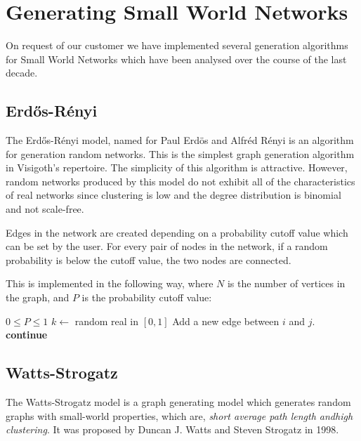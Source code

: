 \documentclass[a4paper,11pt,titlepage]{article}
\let\stdsection\section         %
\renewcommand{\section}{\newpage\stdsection}
\begin{document}

\section{Generating Small World Networks}
\label{smallworldnetworks}

On request of our customer we have implemented several generation
algorithms for Small World Networks which have been analysed over
the course of the last decade.

\subsection{Erd\H{o}s-R\'{e}nyi}
The Erd\H{o}s-R\'{e}nyi model, named for Paul Erd\"{o}s and Alfr\'{e}d R\'{e}nyi
is an algorithm for generation random networks. This is the simplest graph
generation algorithm in Visigoth's repertoire. The simplicity of this algorithm
is attractive. However, random networks produced by this model do not exhibit
all of the characteristics of real networks since clustering is low and the
degree distribution is binomial and not scale-free.

Edges in the network are created depending on a probability cutoff value which
can be set by the user. For every pair of nodes in the network, if a random
probability is below the cutoff value, the two nodes are connected.

This is implemented in the following way, where $N$ is the number of vertices
in the graph, and $P$ is the probability cutoff value:
\begin{algorithmic}
  \REQUIRE $0 \leq P \leq 1$
      \STATE $k \gets $ random real in $[0, 1]$
        \STATE Add a new edge between $i$ and $j$.
      \ELSE
        \STATE \textbf{continue}
      \ENDIF
    \ENDFOR
  \ENDFOR
\end{algorithmic}

\subsection{Watts-Strogatz}
The Watts-Strogatz model is a graph generating model which generates random
graphs with small-world properties, which are, \emph{short average path length
andhigh clustering}. It was proposed by Duncan J. Watts and Steven Strogatz in
1998.
\end{document}
